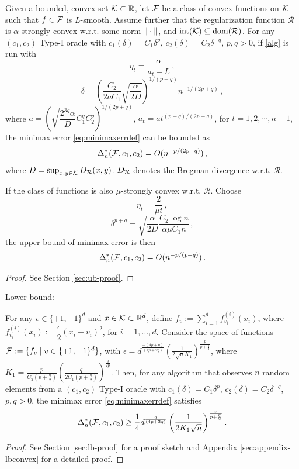 \begin{theorem}
\label{thm:ub}
Given a bounded, convex set $\mathcal{K} \subset \mathbb{R}$,
let $\mathcal{F}$ be a class of convex functions on $\mathcal{K}$ such that $f \in \mathcal{F}$ is $L$-smooth.
Assume further that the regularization function $\mathcal{R}$ is $\alpha$-strongly convex w.r.t. some norm $\|\cdot\|$, and $\operatorname{int}(\mathcal{K})\subseteq \operatorname{dom}(\mathcal{R})$.
For any $(c_1,c_2)$ Type-I oracle 
 with $c_1(\delta) = C_1 \delta^p$, $c_2(\delta) = C_2 \delta^{-q}$, $p,q>0$, 
 if \cref{alg} is run with 
 \[
 \eta_t = \dfrac{\alpha}{a_t+L} \,,
 \]
 \[
 \delta = \left( \dfrac{C_2}{2aC_1}\sqrt{\dfrac{\alpha}{2D}} \right)^{1/(p+q)}n^{-1/(2p+q)} \,,
 \] 
 where
 $a = \left( \sqrt{\dfrac{2^{3q}\alpha}{D}}C_1^q C_2^p \right)^{1/(2p+q)}$,
 $a_t = a t^{(p+q)/(2p+q)}$, for $t=1, 2, \cdots, n-1$,
  the minimax error \eqref{eq:minimaxerrdef} can be bounded as
 \begin{align*}
\Delta_n^*(\mathcal{F},c_1,c_2)= O(n^{-p/(2p+q)})\,,
 \end{align*}
 where $D=\sup_{x,y\in \mathcal{K}} D_{\mathcal{R}}(x,y)$. $D_{\mathcal{R}}$ denotes the Bregman divergence w.r.t. $\mathcal{R}$.
 
If the class of functions is also $\mu$-strongly convex w.r.t. $\mathcal{R}$. Choose
\[
 \eta_t = \dfrac{2}{\mu t} \,,
\]
\[
\delta^{p+q} =  \sqrt{\dfrac{\alpha}{2D}}\dfrac{C_2 \log n}{\alpha \mu C_1 n} \,,
\]
the upper bound of minimax error is then
 \begin{align*}
\Delta_n^*(\mathcal{F},c_1,c_2)= O(n^{-p/(p+q)})\,.
 \end{align*}
\end{theorem}
\begin{proof}
See Section \ref{sec:ub-proof}.
\end{proof}


Lower bound:
\begin{theorem}
\label{thm:lb-convex}
For any $v \in \{+1,-1\}^d$ and $x \in \mathcal{K}\subset \mathbb{R}^d$, define $f_v := \sum_{i=1}^d f^{(i)}_{v_i}(x_i)$, where
$f^{(i)}_{v_i}(x_i) := \dfrac{\epsilon}{2} (x_i - v_i)^2$, for $i=1,\ldots,d$.
Consider the space of functions $\mathcal{F}:= \{f_v \mid v  \in \{+1,-1\}^d\}$, with $\epsilon = d^{\frac{-(4p+q)}{(4p+2q)}}\left(\frac{1}{2\sqrt{n} K_1} \right)^{\frac{p}{p+\frac{q}{2}}}$, where \\$K_1 = \frac{p}{C_2(p+\tfrac{q}{2})} \left(\frac{q}{2C_1(p+\tfrac{q}{2})}\right)^{\frac{q}{2p}}$. 
Then, for any algorithm that observes $n$ random elements from a $(c_1,c_2)$ Type-I oracle 
 with $c_1(\delta) = C_1 \delta^p$, $c_2(\delta) = C_2 \delta^{-q}$, $p,q>0$,
 the minimax error \eqref{eq:minimaxerrdef} satisfies
\[
\Delta_n^{*}(\mathcal{F}, c_1,c_2) \ge \dfrac{1}{4}d^{\frac{q}{(4p+2q)}}\left(\dfrac{1}{2 K_1 \sqrt n}\right)^{\frac{p}{p+\frac{q}{2}}}.
\]
\end{theorem}
\begin{proof}
 See Section \ref{sec:lb-proof} for a proof sketch and Appendix \ref{sec:appendix-lbconvex} for a detailed proof.
\end{proof}

